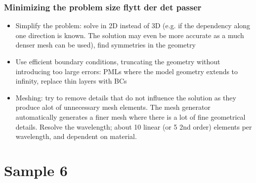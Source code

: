 \subsubsection*{Minimizing the problem size \color{red}flytt der det passer}
\begin{itemize}
    \item Simplify the problem: solve in 2D instead of 3D (e.g. if the dependency along one direction is known. The solution may even be more accurate as a much denser mesh can be used), find symmetries in the geometry
    \item Use efficient boundary conditions, truncating the geometry without introducing too large errors: PMLs where the model geometry extends to infinity, replace thin layers with BCs
    \item Meshing: try to remove details that do not influence the solution as they produce alot of unnecessary mesh elements. The mesh generator automatically generates a finer mesh where there is a lot of fine geometrical details. Resolve the wavelength; about 10 linear (or 5 2nd order) elements per wavelength, and dependent on material.
    
\end{itemize}

\section{Sample 6}


